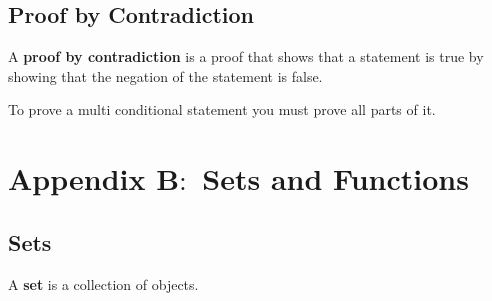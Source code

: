 \documentclass{article}
\begin{document}
\subsection*{Proof by Contradiction}
A \textbf{proof by contradiction} is a proof that shows that a statement is true by showing that the negation of the statement is false.

To prove a multi conditional statement you must prove all parts of it.

\section{Appendix B$\colon$ Sets and Functions}
\subsection*{Sets}
A \textbf{set} is a collection of objects.
\end{document}
